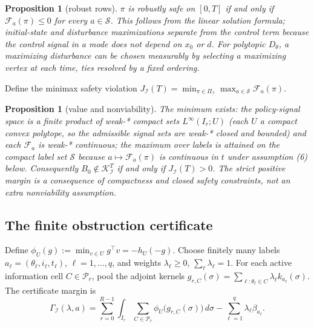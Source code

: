 \documentclass[10pt,twocolumn]{article}
\theoremstyle{plain}
\newtheorem{proposition}[theorem]{Proposition}
\theoremstyle{definition}
\theoremstyle{remark}
\begin{document}
\begin{proposition}[robust rows]\label{prop:rows}
\(\pi\) is robustly safe on \([0,T]\) if and only if
\(\mathcal{F}_a(\pi) \le 0\) for every \(a \in \mathscr{S}\). This follows
from the linear solution formula; initial-state and disturbance maximizations
separate from the control term because the control signal in a mode does not
depend on \(x_0\) or \(d\). For polytopic \(D_\theta\), a maximizing
disturbance can be chosen measurably by selecting a maximizing vertex at each
time, ties resolved by a fixed ordering.
\end{proposition}

Define the minimax safety violation
\(J_{\mathcal{I}}(T) = \min_{\pi \in \Pi_{\mathcal{I}}} \max_{a \in
\mathscr{S}} \mathcal{F}_a(\pi)\).

\begin{proposition}[value and nonviability]\label{prop:value}
The minimum exists: the policy-signal space is a finite product of
weak-* compact sets \(L^\infty(I_r; U)\) (each \(U\) a compact convex
polytope, so the admissible signal sets are weak-* closed and bounded) and
each \(\mathcal{F}_a\) is weak-* continuous; the maximum over labels is
attained on the compact label set \(\mathscr{S}\) because
\(a \mapsto \mathcal{F}_a(\pi)\) is continuous in \(t\) under
assumption (6) below. Consequently
\(B_0 \notin \mathcal{K}_{\mathcal{I}}^T\) if and only if
\(J_{\mathcal{I}}(T) > 0\). The strict positive margin is a consequence of
compactness and closed safety constraints, not an extra nonviability
assumption.
\end{proposition}

\subsection{The finite obstruction certificate}\label{certificate}

Define \(\phi_U(g) := \min_{v \in U} g^\top v = -h_U(-g)\). Choose finitely
many labels \(a_\ell = (\theta_\ell, i_\ell, t_\ell)\), \(\ell = 1,\dots,q\),
and weights \(\lambda_\ell \ge 0\), \(\sum_\ell \lambda_\ell = 1\). For each
active information cell \(C \in \mathcal{P}_r\), pool the adjoint kernels
\(g_{r,C}(\sigma) = \sum_{\ell : \theta_\ell \in C} \lambda_\ell
k_{a_\ell}(\sigma)\). The certificate margin is
\[
\Gamma_{\mathcal{I}}(\lambda, a)
= \sum_{r=0}^{R-1} \int_{I_r} \sum_{C \in \mathcal{P}_r}
\phi_U\!\bigl(g_{r,C}(\sigma)\bigr)\, d\sigma
- \sum_{\ell=1}^q \lambda_\ell \beta_{a_\ell}.
\tag{1}
\]
\end{document}
